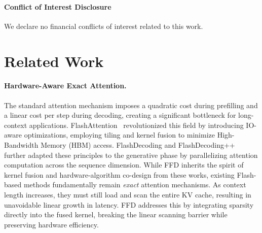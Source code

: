 \documentclass[]{mosi}
\theoremstyle{plain}
\theoremstyle{definition}
\theoremstyle{remark}
\begin{document}
\paragraph{Conflict of Interest Disclosure}
We declare no financial conflicts of interest related to this work.


\section{Related Work}
\label{sec:related}




\paragraph{Hardware-Aware Exact Attention.}
The standard attention mechanism imposes a quadratic cost during prefilling and a linear cost per step during decoding, creating a significant bottleneck for long-context applications. FlashAttention~\citep{dao2023flashattention, shah2024flashattention} revolutionized this field by introducing IO-aware optimizations, employing tiling and kernel fusion to minimize High-Bandwidth Memory (HBM) access. FlashDecoding and FlashDecoding++~\citep{hong2023flashdecoding++} further adapted these principles to the generative phase by parallelizing attention computation across the sequence dimension.
While FFD inherits the spirit of kernel fusion and hardware-algorithm co-design from these works, existing Flash-based methods fundamentally remain \textit{exact} attention mechanisms. As context length increases, they must still load and scan the entire KV cache, resulting in unavoidable linear growth in latency. FFD addresses this by integrating sparsity directly into the fused kernel, breaking the linear scanning barrier while preserving hardware efficiency.
\end{document}
